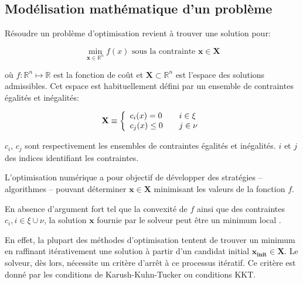 \subsection{Modélisation mathématique d'un problème}


Résoudre un problème d'optimisation revient à trouver une solution pour:

\begin{equation}
  \min_{\mathbf{x} \in \mathbb{R}^n} f(x) \text{ sous la contrainte } \mathbf{x} \in \mathbf{X}
\end{equation}

où $f : \mathbb{R}^n \mapsto \mathbb{R}$ est la fonction de coût et
$\mathbf{X} \subset \mathbb{R}^n$ est l'espace des solutions
admissibles. Cet espace est habituellement défini par un ensemble de
contraintes égalités et inégalités:

\begin{equation}
  \mathbf{X} \equiv \left\{
  \begin{array}{l l}
    c_i (x) = 0    & \quad i \in \xi \\
    c_j (x) \leq 0 & \quad j \in \nu \\
  \end{array} \right.
\end{equation}

$c_i$, $c_j$ sont respectivement les ensembles de contraintes égalités
et inégalités. $i$ et $j$ des indices identifiant les contraintes.


L'optimisation numérique a pour objectif de développer des stratégies
-- algorithmes -- pouvant déterminer $\mathbf{x} \in \mathbf{X}$
minimisant les valeurs de la fonction $f$.


En absence d'argument fort tel que la convexité de $f$ ainsi que des
contraintes $c_i, i \in \xi \cup \nu$, la solution $\mathbf{x}$
fournie par le solveur peut être un minimum local .


En effet, la plupart des méthodes d'optimisation tentent de trouver un
minimum en raffinant itérativement une solution à partir d'un candidat
initial $\mathbf{x_{\text{init}}} \in \mathbf{X}$. Le solveur, dès
lors, nécessite un critère d'arrêt à ce processus itératif. Ce critère
est donné par les conditions de Karush-Kuhn-Tucker  ou conditions KKT.

